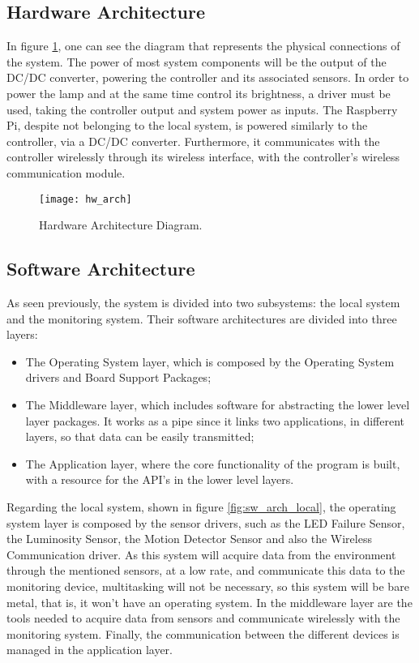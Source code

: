 \subsection{Hardware Architecture}
In figure \ref{fig:hw_arch}, one can see the diagram that represents the physical connections of the system. The power of most system components will be the output of the DC/DC converter, powering the controller and its associated sensors. In order to power the lamp and at the same time control its brightness, a driver must be used, taking the controller output and system power as inputs. The Raspberry Pi, despite not belonging to the local system, is powered similarly to the controller, via a DC/DC converter. Furthermore, it communicates with the controller wirelessly through its wireless interface, with the controller's wireless communication module.

\begin{figure}[ht]
	\centering
	\texttt{[image: hw\_arch]}
	\caption{Hardware Architecture Diagram.}
	\label{fig:hw_arch}
\end{figure}

\subsection{Software Architecture}
As seen previously, the system is divided into two subsystems: the local system and the monitoring system. Their software architectures are divided into three layers:

\begin{itemize}
	\item The Operating System layer, which is composed by the Operating System drivers and Board Support Packages;
	\item The Middleware layer, which includes software for abstracting the lower level layer packages. It works as a pipe since it links two applications, in different layers, so that data can be easily transmitted;
	\item The Application layer, where the core functionality of the program is built, with a resource for the API's in the lower level layers.
\end{itemize}

Regarding the local system, shown in figure \ref{fig:sw_arch_local}, the operating system layer is composed by the sensor drivers, such as the LED Failure Sensor, the Luminosity Sensor, the Motion Detector Sensor and also the Wireless Communication driver. As this system will acquire data from the environment through the mentioned sensors, at a low rate, and communicate this data to the monitoring device, multitasking will not be necessary, so this system will be bare metal, that is, it won’t have an operating system. In the middleware layer are the tools needed to acquire data from sensors and communicate wirelessly with the monitoring system. Finally, the communication between the different devices is managed in the application layer.

